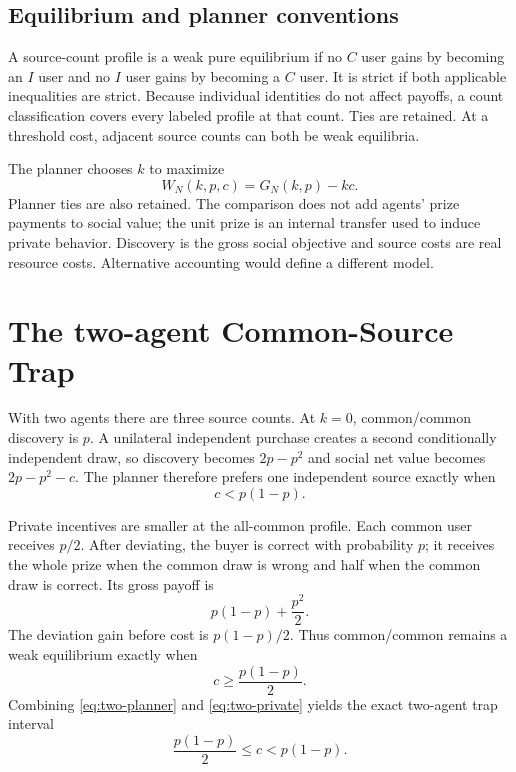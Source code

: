 \documentclass[11pt]{article}
\begin{document}
\subsection{Equilibrium and planner conventions}

A source-count profile is a weak pure equilibrium if no $C$ user gains by
becoming an $I$ user and no $I$ user gains by becoming a $C$ user. It is strict
if both applicable inequalities are strict. Because individual identities do
not affect payoffs, a count classification covers every labeled profile at that
count. Ties are retained. At a threshold cost, adjacent source counts can both
be weak equilibria.

The planner chooses $k$ to maximize
\begin{equation}
 W_N(k,p,c)=G_N(k,p)-kc.
 \label{eq:welfare}
\end{equation}
Planner ties are also retained. The comparison does not add agents' prize
payments to social value; the unit prize is an internal transfer used to induce
private behavior. Discovery is the gross social objective and source costs are
real resource costs. Alternative accounting would define a different model.

\section{The two-agent Common-Source Trap}

With two agents there are three source counts. At $k=0$, common/common discovery
is $p$. A unilateral independent purchase creates a second conditionally
independent draw, so discovery becomes $2p-p^2$ and social net value becomes
$2p-p^2-c$. The planner therefore prefers one independent source exactly when
\begin{equation}
 c<p(1-p).
 \label{eq:two-planner}
\end{equation}

Private incentives are smaller at the all-common profile. Each common user
receives $p/2$. After deviating, the buyer is correct with probability $p$; it
receives the whole prize when the common draw is wrong and half when the common
draw is correct. Its gross payoff is
\[
 p(1-p)+\frac{p^2}{2}.
\]
The deviation gain before cost is $p(1-p)/2$. Thus common/common remains a weak
equilibrium exactly when
\begin{equation}
 c\ge\frac{p(1-p)}{2}.
 \label{eq:two-private}
\end{equation}
Combining \eqref{eq:two-planner} and \eqref{eq:two-private} yields the exact
two-agent trap interval
\begin{equation}
 \frac{p(1-p)}{2}\le c<p(1-p).
 \label{eq:two-trap}
\end{equation}
\end{document}
